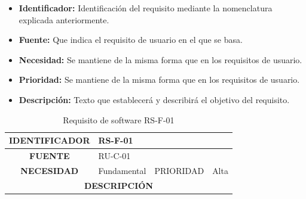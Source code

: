 \begin{itemize}
\item \textbf{Identificador:} Identificación del requisito mediante la nomenclatura explicada anteriormente.
\item \textbf{Fuente:} Que indica el requisito de usuario en el que se basa.
\item \textbf{Necesidad:} Se mantiene de la misma forma que en los requisitos de usuario.
\item \textbf{Prioridad:} Se mantiene de la misma forma que en los requisitos de usuario.
\item \textbf{Descripción:} Texto que establecerá y describirá el objetivo del requisito.
\end{itemize}

\begin{table}[htp!]
\centering
\caption{Requisito de software RS-F-01}
\label{rs1}
\begin{tabular}{|c|l|c|l|}
\hline
\textbf{IDENTIFICADOR}                                                                                       & \multicolumn{3}{l|}{RS-F-01}                                                                                                                                                                                                                                                                     \\ \hline
\textbf{FUENTE}                                                                                              & \multicolumn{3}{l|}{RU-C-01}                                                                                                                                                                                                                                                                     \\ \hline
\textbf{NECESIDAD}                                                                                           & Fundamental                                                                                       & PRIORIDAD                                                                                       & Alta                                                                                       \\ \hline
\multicolumn{4}{|c|}{\textbf{DESCRIPCIÓN}}                                                                                                                                                                                                                                                                                                                                                                      \\ \hline

\end{tabular}
\end{table}
